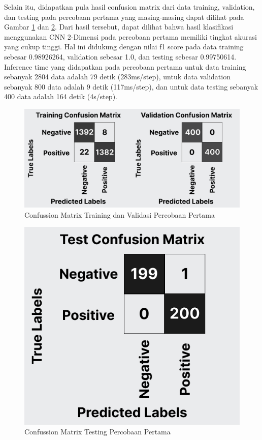 Selain itu, didapatkan pula hasil confusion matrix dari data training, validation, dan testing pada percobaan pertama yang masing-masing dapat dilihat pada Gambar \ref{fig:tvcon1} dan \ref{fig:testcon1}. Dari hasil tersebut, dapat dilihat bahwa hasil klasifikasi menggunakan CNN 2-Dimensi pada percobaan pertama memiliki tingkat akurasi yang cukup tinggi. Hal ini didukung dengan nilai f1 score pada data training sebesar 0.98926264, validation sebesar 1.0, dan testing sebesar 0.99750614. Inference time yang didapatkan pada percobaan pertama untuk data training sebanyak 2804 data adalah 79 detik (283ms/step), untuk data validation sebanyak 800 data adalah 9 detik (117ms/step), dan untuk data testing sebanyak 400 data adalah 164 detik (4s/step).

\begin{figure} [H] \centering
    \includegraphics[scale=0.3]{gambar/bab4/tvcon1.png}
    \caption{Confussion Matrix Training dan Validasi Percobaan Pertama}
    \label{fig:tvcon1}
\end{figure}

\begin{figure} [H] \centering
    \includegraphics[scale=0.3]{gambar/bab4/testcon1.png}
    \caption{Confussion Matrix Testing Percobaan Pertama}
    \label{fig:testcon1}
\end{figure}

